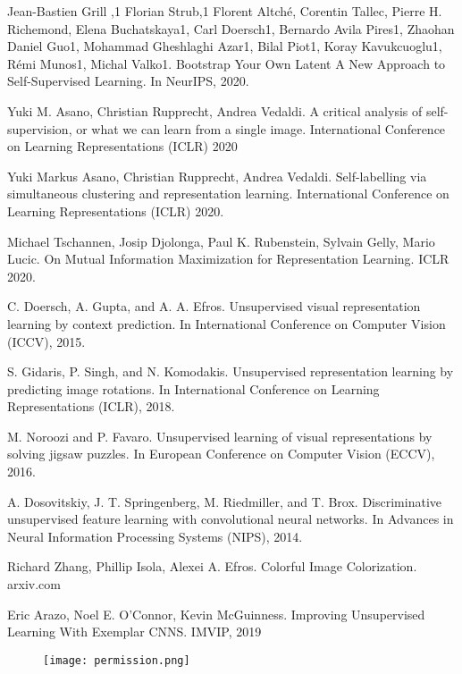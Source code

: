 \documentclass[a4paper, 12pt]{article}
\begin{document}
\begin{thebibliography}{21}

Jean-Bastien Grill ,1 Florian Strub,1 Florent Altché, Corentin Tallec, Pierre H. Richemond, Elena Buchatskaya1, Carl Doersch1, Bernardo Avila Pires1, Zhaohan Daniel Guo1, Mohammad Gheshlaghi Azar1, Bilal Piot1, Koray Kavukcuoglu1, Rémi Munos1, Michal Valko1. Bootstrap Your Own Latent A New Approach to Self-Supervised Learning. In NeurIPS, 2020.

Yuki M. Asano, Christian Rupprecht, Andrea Vedaldi. A critical analysis of self-supervision, or what we can learn from a single image. International Conference on Learning Representations (ICLR) 2020

Yuki Markus Asano, Christian Rupprecht, Andrea Vedaldi. Self-labelling via simultaneous clustering and representation learning.
International Conference on Learning Representations (ICLR) 2020.

Michael Tschannen, Josip Djolonga, Paul K. Rubenstein, Sylvain Gelly, Mario Lucic. On Mutual Information Maximization for Representation Learning. 	ICLR 2020.

 C. Doersch, A. Gupta, and A. A. Efros. Unsupervised visual representation learning by context prediction. In International Conference on Computer Vision (ICCV), 2015.



S. Gidaris, P. Singh, and N. Komodakis. Unsupervised representation learning by predicting image rotations. In International Conference on Learning Representations (ICLR),
2018.

 M. Noroozi and P. Favaro. Unsupervised learning of visual
representations by solving jigsaw puzzles. In European Conference on Computer Vision (ECCV), 2016.


 A. Dosovitskiy, J. T. Springenberg, M. Riedmiller, and
T. Brox. Discriminative unsupervised feature learning with
convolutional neural networks. In Advances in Neural Information Processing Systems (NIPS), 2014.

 Richard Zhang, Phillip Isola, Alexei A. Efros. Colorful Image Colorization. arxiv.com

 Eric Arazo, Noel E. O'Connor, Kevin McGuinness. Improving Unsupervised Learning With Exemplar CNNS. IMVIP, 2019



\end{thebibliography}

\newpage

\begin{figure}[htp]
    \centering
    \texttt{[image: permission.png]}

\end{figure}

\end{document}
